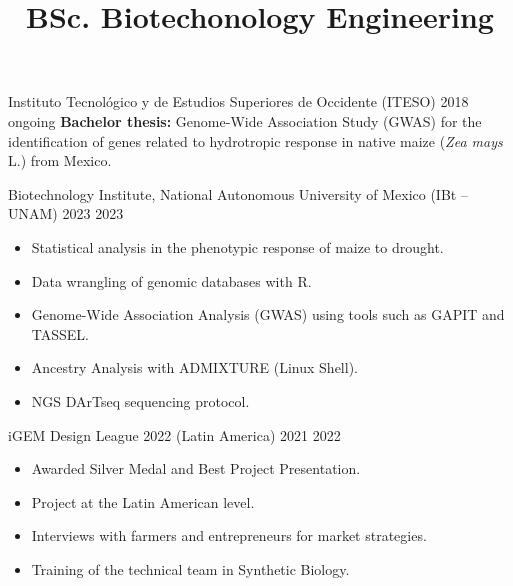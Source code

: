 \documentclass{simplecv}
\title{BSc. Biotechonology Engineering}
\begin{document}
\setmainfont{XCharter} %
\setsansfont{Inter} %
\nocite{*}
\makecvheader{}
\thispagestyle{firstpage}

{\small\sffamily\setlength{\parskip}{6pt}%

}\vspace{0.75em}

\vspace{0.5em}
    {Instituto Tecnológico y de Estudios Superiores de Occidente (ITESO)} %
    {} %
    {2018} %
    {ongoing} %
    {
        \textbf{Bachelor thesis:} Genome-Wide Association Study (GWAS) for the identification of genes related to hydrotropic response in native maize (\textit{Zea mays} L.) from Mexico.
    } %
    

        {Biotechnology Institute, National Autonomous University of Mexico (IBt -- UNAM)}
        {}
        {2023}
        {2023}
        {%
            \vspace{-11pt}
            \begin{itemize}[leftmargin=*]
            \setlength{\itemsep}{0cm}
              \item Statistical analysis in the phenotypic response of maize to drought.
              \item Data wrangling of genomic databases with R.
              \item Genome-Wide Association Analysis (GWAS) using tools such as GAPIT and TASSEL.
              \item Ancestry Analysis with ADMIXTURE (Linux Shell).
              \item NGS DArTseq sequencing protocol.
            \end{itemize}
        }

    {iGEM Design League 2022 (Latin America)}
    {}
    {2021}
    {2022}
    {%
        \vspace{-11pt}
        \begin{itemize}[leftmargin=*]
        \setlength{\itemsep}{0cm}
          \item Awarded Silver Medal and Best Project Presentation.
          \item Project at the Latin American level.
          \item Interviews with farmers and entrepreneurs for market strategies.
          \item Training of the technical team in Synthetic Biology.
        \end{itemize}
    }
\end{document}
